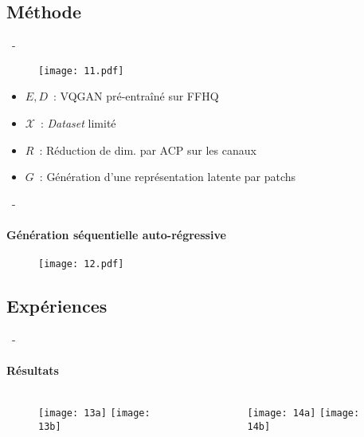 \documentclass[aspectratio=169, 22pt]{beamer}
\begin{document}
\subsection{Méthode}
\begin{frame}{\secname~- \subsecname}
  \begin{figure}
    \texttt{[image: 11.pdf]}
  \end{figure}
  \begin{itemize}
  \item $E, D$ : VQGAN pré-entraîné sur FFHQ
  \item $\mathcal{X}$ : \emph{Dataset} limité
  \item $R$ : Réduction de dim. par ACP sur les canaux
  \item $G$ : \alert{Génération d'une représentation latente par patchs}
  \end{itemize}
\end{frame}

\begin{frame}{\secname~- \subsecname}
  \framesubtitle{Génération séquentielle auto-régressive}
  \begin{figure}
    \texttt{[image: 12.pdf]}
  \end{figure}
\end{frame}

\subsection{Expériences}
\begin{frame}{\secname~- \subsecname}
  \framesubtitle{Résultats}
  \begin{columns}
    \begin{column}{0.5\linewidth}
      \begin{figure}
        \texttt{[image: 13a]}
        \texttt{[image: 13b]}
      \end{figure}
    \end{column}
    \begin{column}{0.5\linewidth}
      \begin{figure}
        \texttt{[image: 14a]}
        \texttt{[image: 14b]}
      \end{figure}
    \end{column}
  \end{columns}
\end{frame}
\end{document}
